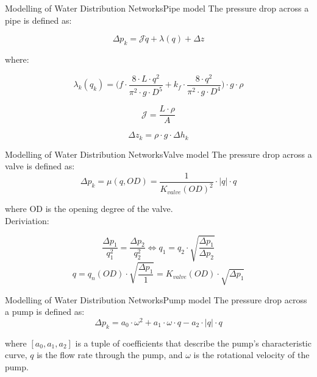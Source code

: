 \begin{frame}{Modelling of Water Distribution Networks}{Pipe model}
The pressure drop across a pipe is defined as:

	\begin{equation}
		\Delta{p_{k}} = \mathcal{J}\dot{q} + \lambda(q) + \Delta z
	\end{equation}

where:

	\begin{equation}
		\lambda_{k}(q_{k})  =	\Big(f \cdot \frac{8\cdot L\cdot q^{2}}{\pi^{2}\cdot g \cdot D^{5}} + k_{f}\cdot \frac{8\cdot q^{2}}{\pi^{2}\cdot g \cdot D^{4}}\Big)\cdot g \cdot \rho
	\end{equation}
	
	
	\begin{equation}
		\mathcal{J} = \frac{L\cdot \rho}{A}
	\end{equation}
	
	\begin{equation}
		\Delta{z_{k}} = \rho \cdot g \cdot \Delta{h_{k}}
	\end{equation}
\end{frame}



\begin{frame}{Modelling of Water Distribution Networks}{Valve model}
	The pressure drop across a valve is defined as:
	\begin{equation}\label{eq:ValvePressure}
		\Delta p_{k} = \mu(q,OD) = \frac{1}{K_{valve}(OD)^2} \cdot |q|\cdot q 
	\end{equation}
	
	where OD is the opening degree of the valve.\\
	
	Deriviation:
	
	\begin{equation}\label{eq:HydrodynamicRatio}
		\frac{\Delta p_1}{q_1^2} = \frac{\Delta p_2}{q_2^2} 	\Leftrightarrow
		q_1 = q_2\cdot\sqrt{\frac{\Delta p_1}{\Delta p_2}}
	\end{equation}
\begin{equation}\label{eq:Kvalve}
	q = q_n(OD)\cdot\sqrt{\frac{\Delta p_1}{1}} = K_{valve}(OD)\cdot\sqrt{\Delta p_1}
\end{equation}
\end{frame}


\begin{frame}{Modelling of Water Distribution Networks}{Pump model}
	The pressure drop across a pump is defined as:
	\begin{equation}\label{eq:PumpPressure}
		\Delta p_{k} =   a_0\cdot \omega^2 +  a_1\cdot \omega \cdot q -a_2\cdot |q|\cdot q
	\end{equation}
	
	where $[a_0,a_1,a_2]$ is a tuple of coefficients that describe the pump's characteristic curve, $q$ is the flow rate through the pump, and $\omega$ is the rotational velocity of the pump.
	
\end{frame}




